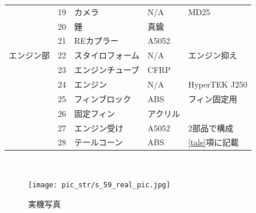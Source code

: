 \documentclass[a4paper,11pt,titlepage,uplatex]{jsarticle}
\begin{document}
\begin{longtable}[H]{cclll}
         &19&カメラ&N/A&MD25\\
         &20&錘&真鍮&\\\midrule     
         &21&REカプラー&A5052&\\ \midrule
        エンジン部&22&スタイロフォーム&N/A&エンジン抑え\\
         &23&エンジンチューブ&CFRP\\
         &24&エンジン&N/A&HyperTEK J250\\
         &25&フィンブロック&ABS&フィン固定用\\
         &26&固定フィン&アクリル&\\
         &27&エンジン受け&A5052&2部品で構成\\
         &28&テールコーン&ABS&\ref{tale}項に記載\\ 
         \bottomrule
\end{longtable}
\renewcommand{\arraystretch}{1.0}

　
\begin{figure}[H]
    \centering
    \texttt{[image: pic\_str/s\_59\_real\_pic.jpg]}
    \caption{実機写真} 
    \label{s_real1}
\end{figure}
\end{document}
